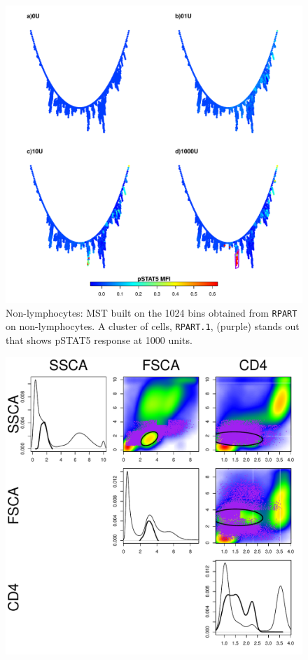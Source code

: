 \begin{figure}[!h]
\begin{minipage}{\textwidth}
\centering
\includegraphics[scale=.6]{figures/rpart-nonlymphocytes-mst-1024bin}
{ Non-lymphocytes: MST built on the 1024 bins obtained from \texttt{RPART} on non-lymphocytes. }
{
    A cluster of cells, \texttt{RPART.1}, (purple) stands out that shows pSTAT5 response at 1000 units.
} 
\end{minipage}
%
\begin{minipage}{.6\textwidth}
\includegraphics[scale=.5]{figures/rpart-nonlymphocytes-scatter-clusters}

\end{minipage}
\end{figure}

